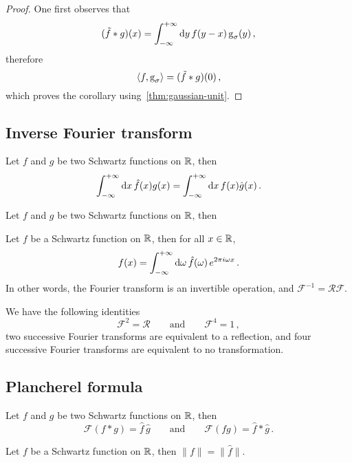 \begin{proof}
  One first observes that
  \begin{equation}
    (\tilde{f}\ast g)(x)=\int_{-\infty}^{+\infty}\mathrm{d}{y}\,f(y-x)\operatorname{g}_{\sigma}(y)\,,
  \end{equation}
  therefore
  \begin{equation}
    \braket{f,\operatorname{g}_{\sigma}}=(\tilde{f}\ast g)(0)\,,
  \end{equation}
  which proves the corollary using~\cref{thm:gaussian-unit}.
\end{proof}
\subsection{Inverse Fourier transform}
\begin{theorem}
  Let $f$ and $g$ be two Schwartz functions on $\mathbb{R}$, then
  \begin{equation}
    \int_{-\infty}^{+\infty}\mathrm{d}{x}\,\hat{f}(x)g(x)=\int_{-\infty}^{+\infty}\mathrm{d}{x}\,f(x)\hat{g}(x)\,.
  \end{equation}
\end{theorem}
\begin{corollary}
  Let $f$ and $g$ be two Schwartz functions on $\mathbb{R}$, then
\end{corollary}
\begin{theorem}
  Let $f$ be a Schwartz function on $\mathbb{R}$, then for all $x\in\mathbb{R}$,
  \begin{equation}
    f(x)=\int_{-\infty}^{+\infty}\mathrm{d}{\omega}\,\hat{f}(\omega)\,e^{2\pi i\omega x}\,.
  \end{equation}
  In other words, the Fourier transform is an invertible operation, and
  $\mathcal{F}^{-1}=\mathcal{R}\mathcal{F}$.
\end{theorem}
\begin{corollary}
  We have the following identities
  \begin{equation}
    \mathcal{F}^2=\mathcal{R}\qquad\text{and}\qquad\mathcal{F}^4=1\,,
  \end{equation}
  \ie two successive Fourier transforms are equivalent to a reflection, and four
  successive Fourier transforms are equivalent to no transformation.
\end{corollary}
\subsection{Plancherel formula}
\begin{theorem}
  Let $f$ and $g$ be two Schwartz functions on $\mathbb{R}$, then
  \begin{equation}
    \mathcal{F}(f\ast g)=\hat{f}\,\hat{g}\qquad\text{and}\qquad
    \mathcal{F}(fg)=\hat{f}\ast\hat{g}\,.
  \end{equation}
\end{theorem}
\begin{theorem}[Plancherel]
  Let $f$ be a Schwartz function on $\mathbb{R}$, then $\|f\|=\|\hat{f}\|$.
\end{theorem}
